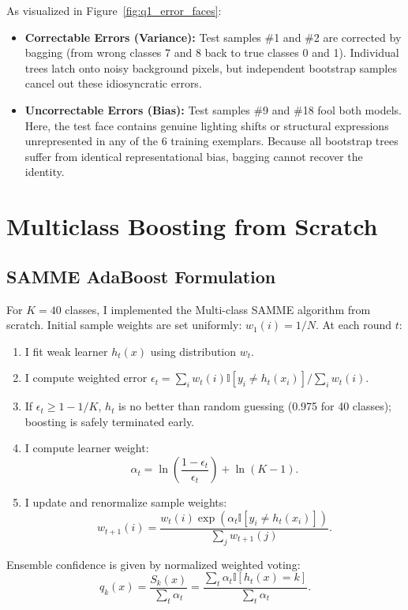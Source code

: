 \documentclass[10pt,twocolumn,letterpaper]{article}
\begin{document}
As visualized in Figure~\ref{fig:q1_error_faces}:
\begin{itemize}[leftmargin=*]
    \item \textbf{Correctable Errors (Variance):} Test samples \#1 and \#2 are corrected by bagging (from wrong classes 7 and 8 back to true classes 0 and 1). Individual trees latch onto noisy background pixels, but independent bootstrap samples cancel out these idiosyncratic errors.
    \item \textbf{Uncorrectable Errors (Bias):} Test samples \#9 and \#18 fool both models. Here, the test face contains genuine lighting shifts or structural expressions unrepresented in any of the 6 training exemplars. Because all bootstrap trees suffer from identical representational bias, bagging cannot recover the identity.
\end{itemize}

\section{Multiclass Boosting from Scratch}
\label{sec:q2}

\subsection{SAMME AdaBoost Formulation}
For $K = 40$ classes, I implemented the Multi-class SAMME algorithm from scratch. Initial sample weights are set uniformly: $w_1(i) = 1/N$. At each round $t$:
\begin{enumerate}[leftmargin=*]
    \item I fit weak learner $h_t(x)$ using distribution $w_t$.
    \item I compute weighted error $\epsilon_t = \sum_{i} w_t(i) \mathbb{I}[y_i \neq h_t(x_i)] / \sum_i w_t(i)$.
    \item If $\epsilon_t \ge 1 - 1/K$, $h_t$ is no better than random guessing (0.975 for 40 classes); boosting is safely terminated early.
    \item I compute learner weight:
    \begin{equation}
        \alpha_t = \ln\left(\frac{1 - \epsilon_t}{\epsilon_t}\right) + \ln(K - 1).
    \end{equation}
    \item I update and renormalize sample weights:
    \begin{equation}
        w_{t+1}(i) = \frac{w_t(i) \exp(\alpha_t \mathbb{I}[y_i \neq h_t(x_i)])}{\sum_{j} w_{t+1}(j)}.
    \end{equation}
\end{enumerate}
Ensemble confidence is given by normalized weighted voting:
\begin{equation}
    q_k(x) = \frac{S_k(x)}{\sum_t \alpha_t} = \frac{\sum_t \alpha_t \mathbb{I}[h_t(x) = k]}{\sum_t \alpha_t}.
\end{equation}
\end{document}

